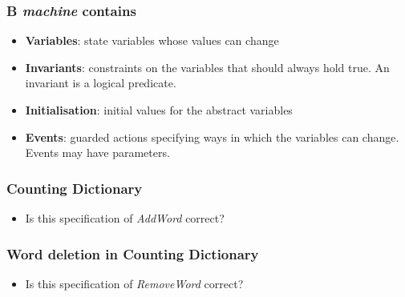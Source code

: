 \documentclass{beamer}
\begin{document}
\begin{frame}


\frametitle{B \textit{machine} contains}
\begin{itemize} \setlength{\itemsep}{6pt}
\item \textbf{Variables}:  state variables whose values can
change
\item \textbf{Invariants}: constraints on the variables that should
always hold true. An invariant is a logical predicate.
\item
\textbf{Initialisation}: initial values for the abstract variables
\item
\textbf{Events}:  guarded actions specifying ways in which the
variables can change.  Events may have parameters.
\end{itemize}


\end{frame}










\begin{frame}

\frametitle{Counting Dictionary}






\operations


\begin{itemize}
 \pause \item {Is this specification of \textit{AddWord} correct?}
\end{itemize}


\end{frame}




\begin{frame}

\frametitle{Word deletion in Counting Dictionary}






\begin{itemize}
  \item {Is this specification of \textit{RemoveWord} correct?}
\end{itemize}


\end{frame}
\end{document}
